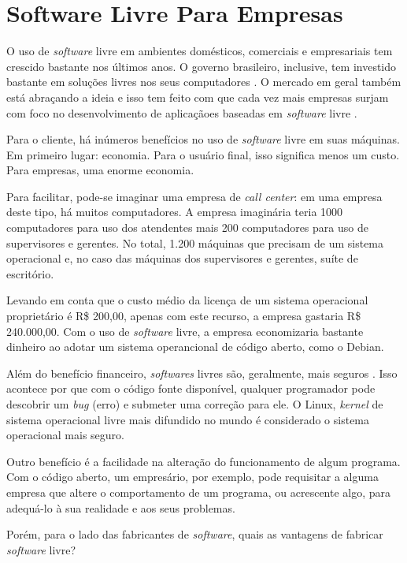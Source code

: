 \documentclass{classe_cn}                 %
\begin{document}
\section{Software Livre Para Empresas}

O uso de \textit{software} livre em ambientes domésticos, comerciais e empresariais tem crescido bastante nos últimos anos. O governo brasileiro, inclusive, tem investido bastante em soluções livres nos seus computadores \cite{Jose:2016}. O mercado em geral também está abraçando a ideia e isso tem feito com que cada vez mais empresas surjam com foco no desenvolvimento de aplicaçãoes baseadas em \textit{software} livre \cite{Hecker:2016}.

Para o cliente, há inúmeros benefícios no uso de \textit{software} livre em suas máquinas. Em primeiro lugar: economia. Para o usuário final, isso significa menos um custo. Para empresas, uma enorme economia.

Para facilitar, pode-se imaginar uma empresa de \textit{call center}: em uma empresa deste tipo, há muitos computadores. A empresa imaginária teria 1000 computadores para uso dos atendentes mais 200 computadores para uso de supervisores e gerentes. No total, 1.200 máquinas que precisam de um sistema operacional e, no caso das máquinas dos supervisores e gerentes, suíte de escritório.

Levando em conta que o custo médio da licença de um sistema operacional proprietário é R\$ 200,00, apenas com este recurso, a empresa gastaria R\$ 240.000,00. Com o uso de \textit{software} livre, a empresa economizaria bastante dinheiro ao adotar um sistema operancional de código aberto, como o Debian.

Além do benefício financeiro, \textit{softwares} livres são, geralmente, mais seguros \cite{Castro}. Isso acontece por que com o código fonte disponível, qualquer programador pode descobrir um \textit{bug} (erro) e submeter uma correção para ele. O Linux, \textit{kernel} de sistema operacional livre mais difundido no mundo é considerado o sistema operacional mais seguro.

Outro benefício é a facilidade na alteração do funcionamento de algum programa. Com o código aberto, um empresário, por exemplo, pode requisitar a alguma empresa que altere o comportamento de um programa, ou acrescente algo, para adequá-lo à sua realidade e aos seus problemas.

Porém, para o lado das fabricantes de \textit{software}, quais as vantagens de fabricar \textit{software} livre?
\end{document}
